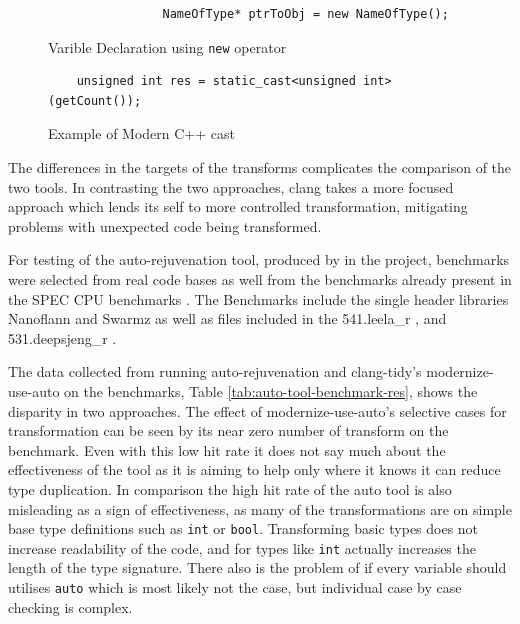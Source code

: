 \documentclass[bsc,frontabs,singlespacing,parskip,deptreport]{infthesis}
\begin{document}
\begin{figure}[H]
    \begin{verbatim}
                NameOfType* ptrToObj = new NameOfType(); 
    \end{verbatim}
    \caption{Varible Declaration using \texttt{new} operator}
    \centering
    \label{fig:code-new-vardec}
\end{figure}

\begin{figure}[H]
    \begin{verbatim}
    unsigned int res = static_cast<unsigned int>(getCount());
    \end{verbatim}
    \caption{Example of Modern C++ cast}
    \centering
    \label{fig:code-modern-cast}
\end{figure}

The differences in the targets of the transforms complicates the comparison of the two tools. In contrasting the two approaches, clang takes a more focused approach which lends its self to more controlled transformation,  mitigating problems with unexpected code being transformed.

For testing of the auto-rejuvenation tool, produced by in the project, benchmarks were selected from real code bases as well from the benchmarks already present in the SPEC CPU benchmarks \cite{}. The Benchmarks include the single header libraries Nanoflann \cite{} and Swarmz \cite{} as well as files included in the 541.leela\_r \cite{SPEC_LEELA}, and 531.deepsjeng\_r \cite{SPEC_DEEPSJENG}.
 
The data collected from running auto-rejuvenation and clang-tidy's modernize-use-auto on the benchmarks, Table \ref{tab:auto-tool-benchmark-res}, shows the disparity in two approaches. The effect of modernize-use-auto's selective cases for transformation can be seen by its near zero number of transform on the benchmark. Even with this low hit rate it does not say much about the effectiveness of the tool as it is aiming to help only where it knows it can reduce type duplication. In comparison the high hit rate of the auto tool is also misleading as a sign of effectiveness, as many of the transformations are on simple base type definitions such as \texttt{int} or \texttt{bool}. Transforming basic types does not increase readability of the code, and for types like \texttt{int} actually increases the length of the type signature. There also is the problem of if every variable should utilises \texttt{auto} which is most likely not the case, but individual case by case checking is complex.   
\end{document}
